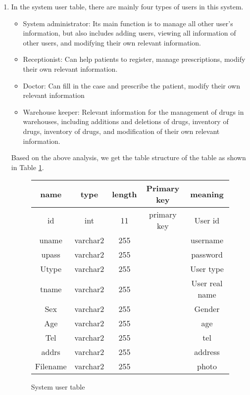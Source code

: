 \begin{enumerate}
    \item 
    
In the system user table, there are mainly four types of users in this system.
\begin{itemize}
    \item System administrator: Its main function is to manage all other user's information, but also includes adding users, viewing all information of other users, and modifying their own relevant information. 
    \item Receptionist: Can help patients to register, manage prescriptions, modify their own relevant information.
    \item Doctor: Can fill in the case and prescribe the patient, modify their own relevant information
    \item Warehouse keeper: Relevant information for the management of drugs in warehouses, including additions and deletions of drugs, inventory of drugs, inventory of drugs, and modification of their own relevant information.
\end{itemize}

Based on the above analysis, we get the table structure of the table as shown in Table \ref{fig:t1}.
\begin{figure}
    \centering
    \begin{tabular}{|c|c|c|c|c|}
    \hline
     name & type & length & Primary key & meaning  \\
    \hline
     id	& int &	11 &primary key & User id \\
    \hline 
	uname & varchar2 & 255 & & username \\
	\hline
    upass & varchar2 & 255 &  & password \\
    \hline
    Utype & varchar2 & 255 &  & User type\\
    \hline
    tname & varchar2 & 255 &  & 	User real name\\
    \hline
    Sex & varchar2 & 255 &  & 	Gender\\
    \hline
    Age & varchar2 & 255 &  & 	age\\
    \hline
    Tel & varchar2 & 255 &  & 	tel\\
    \hline
    addrs & varchar2 & 255 &  & 	address \\
    \hline
    Filename & varchar2 & 255 &  & 	photo\\			
    \hline

\end{tabular}
    \caption{System user table}
    \label{fig:t1}
\end{figure}



\end{enumerate}
